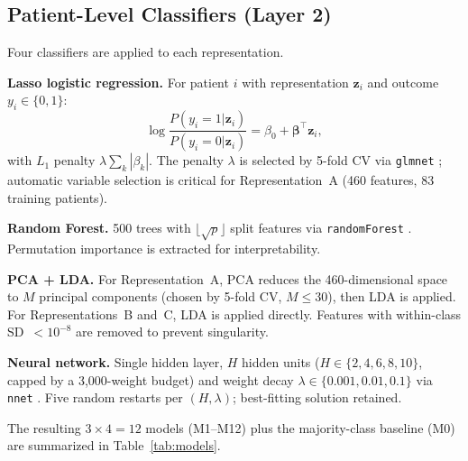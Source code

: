 \documentclass[12pt, onecolumn]{article}
\begin{document}
\subsection{Patient-Level Classifiers (Layer 2)}

Four classifiers are applied to each representation.

\textbf{Lasso logistic regression.} For patient $i$ with representation $\mathbf{z}_i$ and outcome $y_i\in\{0,1\}$:
\begin{equation}
  \log\frac{P(y_i=1|\mathbf{z}_i)}{P(y_i=0|\mathbf{z}_i)}
  = \beta_0 + \boldsymbol{\beta}^\top \mathbf{z}_i,
\end{equation}
with $L_1$ penalty $\lambda\sum_k|\beta_k|$. The penalty
$\lambda$ is selected by 5-fold CV via \texttt{glmnet}
\citep{friedman2010}; automatic variable selection is critical
for Representation~A (460 features, 83 training patients).

\textbf{Random Forest.} 500 trees with $\lfloor\sqrt{p}\rfloor$
split features via \texttt{randomForest} \citep{liaw2002}.
Permutation importance is extracted for interpretability.

\textbf{PCA + LDA.} For Representation~A, PCA reduces the 460-dimensional space to $M$ principal components (chosen by 5-fold CV, $M \leq 30$), then LDA is applied. For Representations~B and~C, LDA is applied directly. Features with within-class SD~$< 10^{-8}$ are removed to prevent singularity.

\textbf{Neural network.} Single hidden layer, $H$ hidden units ($H \in \{2,4,6,8,10\}$, capped by a 3,000-weight budget) and weight decay $\lambda \in \{0.001, 0.01, 0.1\}$ via \texttt{nnet}
\citep{venables2002}. Five random restarts per $(H,\lambda)$; best-fitting solution retained.

The resulting $3\times4 = 12$ models (M1--M12) plus the
majority-class baseline (M0) are summarized in
Table~\ref{tab:models}.
\end{document}
